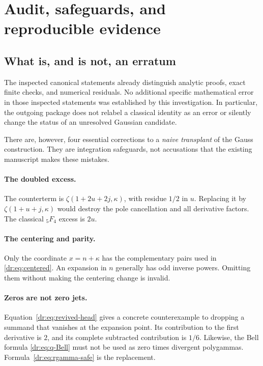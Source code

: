 \documentclass[11pt,letterpaper]{article}
\numberwithin{equation}{section}
\theoremstyle{definition}
\theoremstyle{remark}
\begin{document}
\section{Audit, safeguards, and reproducible evidence}
\label{dr:sec:audit}

\subsection{What is, and is not, an erratum}

The inspected canonical statements already distinguish analytic proofs,
exact finite checks, and numerical residuals. No additional specific
mathematical error in those inspected statements was established by this
investigation. In particular, the outgoing package does not relabel a
classical identity as an error or silently change the status of an
unresolved Gaussian candidate.

There are, however, four essential corrections to a \emph{naive
transplant} of the Gauss construction. They are integration safeguards,
not accusations that the existing manuscript makes these mistakes.

\paragraph{The doubled excess.}
The counterterm is $\zeta(1+2u+2j,\kappa)$, with residue $1/2$ in
$u$. Replacing it by $\zeta(1+u+j,\kappa)$ would destroy the pole
cancellation and all derivative factors. The classical ${}_5F_4$ excess
is $2u$.

\paragraph{The centering and parity.}
Only the coordinate $x=n+\kappa$ has the complementary pairs used in
\eqref{dr:eq:centered}. An expansion in $n$ generally has odd inverse
powers. Omitting them without making the centering change is invalid.

\paragraph{Zeros are not zero jets.}
Equation~\eqref{dr:eq:revived-head} gives a concrete counterexample to
dropping a summand that vanishes at the expansion point. Its contribution
to the first derivative is $2$, and its complete subtracted contribution
is $1/6$. Likewise, the Bell formula \eqref{dr:eq:q-Bell} must not be
used as zero times divergent polygammas. Formula~\eqref{dr:eq:rgamma-safe}
is the replacement.
\end{document}
